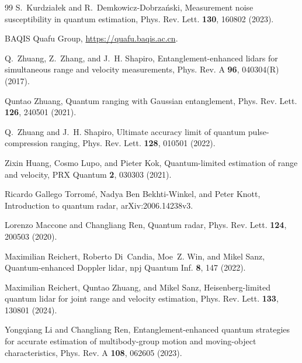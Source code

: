 \documentclass[
aps,
prl,
twocolumn,

superscriptaddress]{revtex4-2}
\begin{document}
\begin{thebibliography}{99}
S.~Kurdzia{\l}ek and R.~Demkowicz-Dobrza{\'n}ski, Measurement noise
susceptibility in quantum estimation, Phys. Rev. Lett. \textbf{130}, 160802
(2023).

BAQIS Quafu Group, \url{https://quafu.baqis.ac.cn}.

Q.~Zhuang, Z.~Zhang, and J.~H. Shapiro, Entanglement-enhanced lidars for
simultaneous range and velocity measurements, Phys. Rev. A \textbf{96},
040304(R) (2017).

Quntao Zhuang, Quantum ranging with Gaussian entanglement, Phys. Rev. Lett.
\textbf{126}, 240501 (2021).

Q.~Zhuang and J.~H. Shapiro, Ultimate accuracy limit of quantum
pulse-compression ranging, Phys. Rev. Lett. \textbf{128}, 010501 (2022).

Zixin Huang, Cosmo Lupo, and Pieter Kok, Quantum-limited estimation of range
and velocity, PRX Quantum \textbf{2}, 030303 (2021).

Ricardo Gallego Torrom{\'e}, Nadya Ben Bekhti-Winkel, and Peter Knott,
Introduction to quantum radar, arXiv:2006.14238v3.

Lorenzo Maccone and Changliang Ren, Quantum radar, Phys. Rev. Lett.
\textbf{124}, 200503 (2020).

Maximilian Reichert, Roberto Di~Candia, Moe~Z. Win, and Mikel Sanz,
Quantum-enhanced Doppler lidar, npj Quantum Inf. \textbf{8}, 147 (2022).

Maximilian Reichert, Quntao Zhuang, and Mikel Sanz, Heisenberg-limited quantum
lidar for joint range and velocity estimation, Phys. Rev. Lett. \textbf{133},
130801 (2024).

Yongqiang Li and Changliang Ren, Entanglement-enhanced quantum strategies for
accurate estimation of multibody-group motion and moving-object
characteristics, Phys. Rev. A \textbf{108}, 062605 (2023).

\end{thebibliography}
\end{document}
